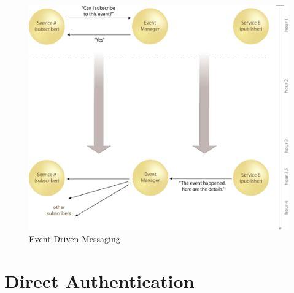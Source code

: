 \begin{figure}[H]
\centering
\includegraphics[scale=2]{images/EDM.png}
\caption{Event-Driven Messaging}
\label{fig:event-driven}
\end{figure}

\section{Direct Authentication}


